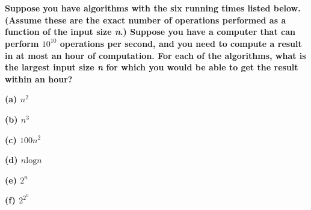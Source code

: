 
\chapter{}
\textbf{
Suppose you have algorithms with the six running times listed below.(Assume these are the exact number of operations performed as a function of the input size \emph{n}.) Suppose you have a computer that can perform $10^{10}$ operations per second, and you need to compute a result in at most an hour of computation. For each of the algorithms, what is the largest input size \emph{n} for which you would be able to get the result within an hour?
}

\textbf{(a) $n^2$}

\textbf{(b) $n^3$}

\textbf{(c) $100n^2$}

\textbf{(d) $n\textrm{log}n$}

\textbf{(e) $2^n$}

\textbf{(f) $2^{2^{n}}$}


\hspace*{\fill} \\

